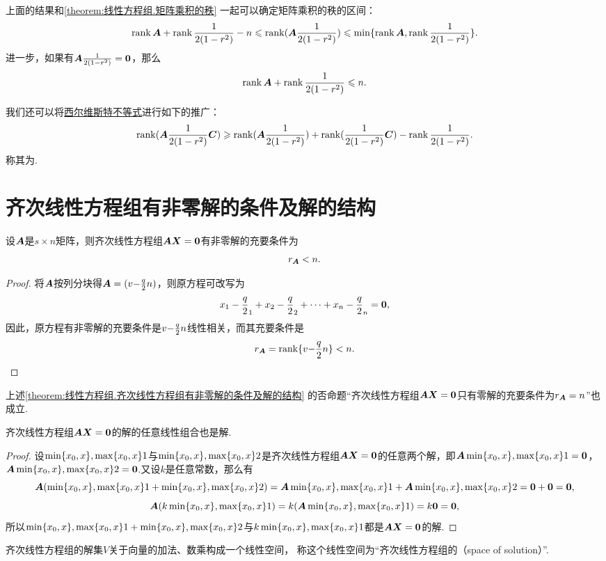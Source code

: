 上面的结果和\cref{theorem:线性方程组.矩阵乘积的秩} 一起可以确定矩阵乘积的秩的区间：\[
\rank\A + \rank\B - n \leqslant \rank(\A\B) \leqslant \min\{\rank\A,\rank\B\}.
\]
进一步，如果有\(\A\B=\z\)，那么\[
\rank\A + \rank\B \leqslant n.
\]

我们还可以将\hyperref[equation:线性方程组.西尔维斯特不等式]{西尔维斯特不等式}进行如下的推广：\begin{equation}\label{equation:线性方程组.弗罗贝尼乌斯不等式}
\rank(\A\B\C) \geqslant \rank(\A\B) + \rank(\B\C) - \rank\B.
\end{equation}称其为.

\section{齐次线性方程组有非零解的条件及解的结构}
\begin{theorem}\label{theorem:线性方程组.齐次线性方程组有非零解的条件及解的结构}
设\(\A\)是\(s \times n\)矩阵，则齐次线性方程组\(\A\x=\z\)有非零解的充要条件为\[
r_{\A} < n.
\]
\begin{proof}
将\(\A\)按列分块得\(\A = (\v{\a}{n})\)，则原方程可改写为\[
x_1 \a_1 + x_2 \a_2 + \dotsb + x_n \a_n = \z,
\]因此，原方程有非零解的充要条件是\(\v{\a}{n}\)线性相关，而其充要条件是\[
r_{\A} = \rank\{\v{\a}{n}\} < n.
\qedhere
\]
\end{proof}
\end{theorem}

上述\cref{theorem:线性方程组.齐次线性方程组有非零解的条件及解的结构}
的否命题“齐次线性方程组\(\A\x=\z\)只有零解的充要条件为\(r_{\A}=n\)”也成立.

\begin{theorem}\label{theorem:线性方程组.齐次线性方程组的解的线性组合也是解}
齐次线性方程组\(\A\x=\z\)的解的任意线性组合也是解.
\begin{proof}
设\(\X1\)与\(\X2\)是齐次线性方程组\(\A \x = \z\)的任意两个解，即\(\A \X1 = \z\)，\(\A \X2 = \z\).又设\(k\)是任意常数，那么有\[
\A (\X1 + \X2) = \A \X1 + \A \X2 = \z + \z = \z,
\]\[
\A (k \X1) = k (\A \X1) = k \z = \z,
\]所以\(\X1 + \X2\)与\(k \X1\)都是\(\A \x = \z\)的解.
\end{proof}
\end{theorem}

\begin{definition}\label{definition:线性方程组.齐次线性方程组的解空间}
齐次线性方程组的解集\(V\)关于向量的加法、数乘构成一个线性空间，%
称这个线性空间为“齐次线性方程组的（space of solution）”.
\end{definition}

